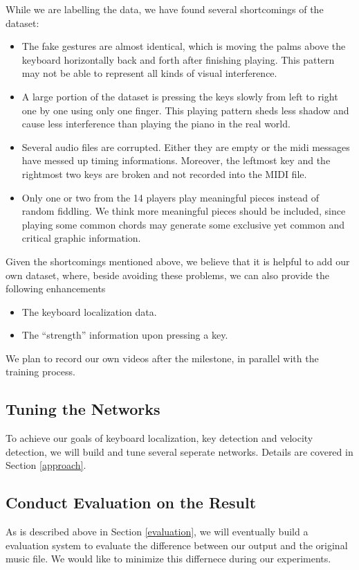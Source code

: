 \documentclass[10pt,twocolumn,letterpaper]{article}
\begin{document}
  
While we are labelling the data, we have found several shortcomings of the dataset:
\begin{itemize}
  \item The fake gestures are almost identical, which is moving the palms above the keyboard horizontally back and forth after finishing playing. This pattern may not be able to represent all kinds of visual interference.
  \item A large portion of the dataset is pressing the keys slowly from left to right one by one using only one finger. This playing pattern sheds less shadow and cause less interference than playing the piano in the real world.
  \item Several audio files are corrupted. Either they are empty or the midi messages have messed up timing informations. Moreover, the leftmost key and the rightmost two keys are broken and not recorded into the MIDI file.
  \item Only one or two from the 14 players play meaningful pieces instead of random fiddling. We think more meaningful pieces should be included, since playing some common chords may generate some exclusive yet common and critical graphic information.
\end{itemize}

Given the shortcomings mentioned above, we believe that it is helpful to add our own dataset, where, beside avoiding these problems, we can also provide the following enhancements

\begin{itemize}
  \item The keyboard localization data.
  \item The ``strength'' information upon pressing a key.
\end{itemize}

We plan to record our own videos after the milestone, in parallel with the training process.

\subsection{Tuning the Networks}

To achieve our goals of keyboard localization, key detection and velocity detection, we will build and tune several seperate networks. Details are covered in Section \ref{approach}.

\subsection{Conduct Evaluation on the Result}

As is described above in Section \ref{evaluation}, we will eventually build a evaluation system to evaluate the difference between our output and the original music file. We would like to minimize this differnece during our experiments.

{\small


}
\end{document}
